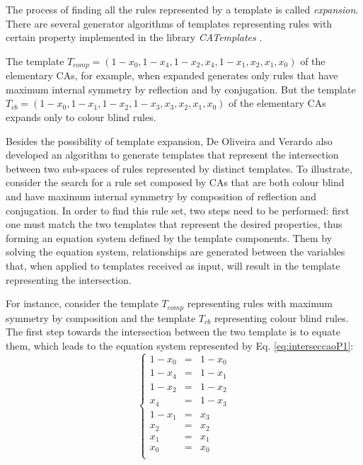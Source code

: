 \documentclass{llncs}
\begin{document}
The process of finding all the rules represented by a template is called \textit{expansion}. There are several generator algorithms of templates representing rules with certain property implemented in the library \textit{CATemplates} \cite{CATemplates}.

The template $T_{comp} = (1 - x_0, 1 - x_4, 1 - x_2, x_4, 1 - x_1, x_2, x_1, x_0)$ of the elementary CAs, for example, when expanded generates only rules that have maximum internal symmetry by reflection and by conjugation. But the template $T_{cb} = (1 - x_0, 1 - x_1, 1 - x_2, 1 - x_3, x_3, x_2, x_1, x_0)$ of the elementary CAs expands only to colour blind rules.

Besides the possibility of template expansion, De Oliveira and Verardo \cite{deOliveira2014,deOliveira2014b} also developed an algorithm to generate templates that represent the intersection between two sub-spaces of rules represented by distinct templates. To illustrate, consider the search for a rule set composed by CAs that are both colour blind and have maximum internal symmetry by composition of reflection and conjugation. In order to find this rule set, two steps need to be performed: first one must match the two templates that represent the desired properties, thus forming an equation system defined by the template components. Them by solving the equation system, relationships are generated between the variables that, when applied to templates received as input, will result in the template representing the intersection.

For instance, consider the template $T_{comp}$ representing rules with maximum symmetry by composition and the template $T_{cb}$ representing colour blind rules. The first step towards the intersection between the two template is to equate them, which leads to the equation system represented by Eq. \ref{eq:interseccaoP1}:
\begin{equation}
\left\{\begin{matrix}
1 - x_0 & = & 1 - x_0 \\
1 - x_4 & = & 1 - x_1 \\
1 - x_2 & = & 1 - x_2 \\
x_4   & = & 1 - x_3 \\
1 - x_1 & = & x_3   \\
x_2   & = & x_2   \\
x_1   & = & x_1   \\
x_0   & = & x_0   \\
\end{matrix}\right.
\label{eq:interseccaoP1}
\end{equation}
\end{document}
